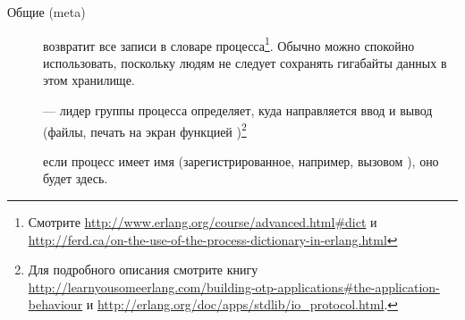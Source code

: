 \begin{description*}
	\item[Общие (meta)] \hfill
		\begin{description}		
	\item[] возвратит все записи в словаре процесса\footnote{Смотрите \href{http://www.erlang.org/course/advanced.html\#dict}{http://www.erlang.org/course/advanced.html\#dict} и \href{http://ferd.ca/on-the-use-of-the-process-dictionary-in-erlang.html}{http://ferd.ca/on-the-use-of-the-process-dictionary-in-erlang.html}}. Обычно можно спокойно использовать, поскольку людям не следует сохранять гигабайты данных в этом хранилище.
		
	\item[] --- лидер группы процесса определяет, куда направляется ввод и вывод (файлы, печать на экран функцией )\footnote{Для подробного описания смотрите книгу \href{http://learnyousomeerlang.com/building-otp-applications\#the-application-behaviour}{http://learnyousomeerlang.com/building-otp-applications\#the-application-behaviour} и \href{http://erlang.org/doc/apps/stdlib/io\_protocol.html}{http://erlang.org/doc/apps/stdlib/io\_protocol.html}.}
			
	\item[] если процесс имеет имя (зарегистрированное, например, вызовом ), оно будет здесь.
			

\end{description}
\end{description*}
